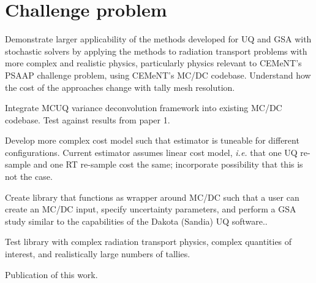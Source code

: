 \section{Challenge problem}
Demonstrate larger applicability of the methods developed for UQ and GSA with stochastic solvers by applying the methods to radiation transport problems with more complex and realistic physics, particularly physics relevant to CEMeNT's PSAAP challenge problem, using CEMeNT's MC/DC codebase. Understand how the cost of the approaches change with tally mesh resolution.
\begin{todolist}
    \item Integrate MCUQ variance deconvolution framework into existing MC/DC codebase. Test against results from paper 1. 
    \item Develop more complex cost model such that estimator is tuneable for different configurations. Current estimator assumes linear cost model, \textit{i.e.} that one UQ re-sample and one RT re-sample cost the same; incorporate possibility that this is not the case.
    \item Create library that functions as wrapper around MC/DC such that a user can create an MC/DC input, specify uncertainty parameters, and perform a GSA study similar to the capabilities of the Dakota (Sandia) UQ software..
    \item Test library with complex radiation transport physics, complex quantities of interest, and realistically large numbers of tallies.
    \item Publication of this work.
\end{todolist}


